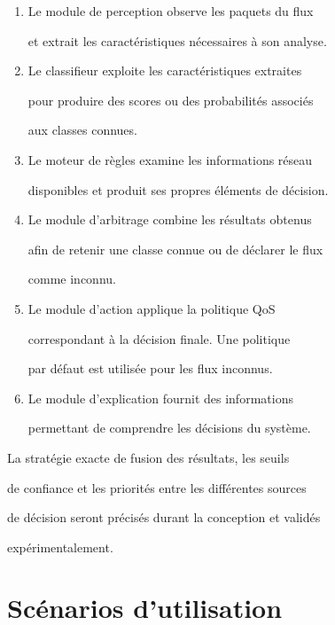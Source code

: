 \begin{enumerate}

    \item Le module de perception observe les paquets du flux

    et extrait les caractéristiques nécessaires à son analyse.



    \item Le classifieur exploite les caractéristiques extraites

    pour produire des scores ou des probabilités associés

    aux classes connues.



    \item Le moteur de règles examine les informations réseau

    disponibles et produit ses propres éléments de décision.



    \item Le module d'arbitrage combine les résultats obtenus

    afin de retenir une classe connue ou de déclarer le flux

    comme inconnu.



    \item Le module d'action applique la politique QoS

    correspondant à la décision finale. Une politique

    par défaut est utilisée pour les flux inconnus.



    \item Le module d'explication fournit des informations

    permettant de comprendre les décisions du système.

\end{enumerate}



La stratégie exacte de fusion des résultats, les seuils

de confiance et les priorités entre les différentes sources

de décision seront précisés durant la conception et validés

expérimentalement.





\section{Scénarios d'utilisation}



